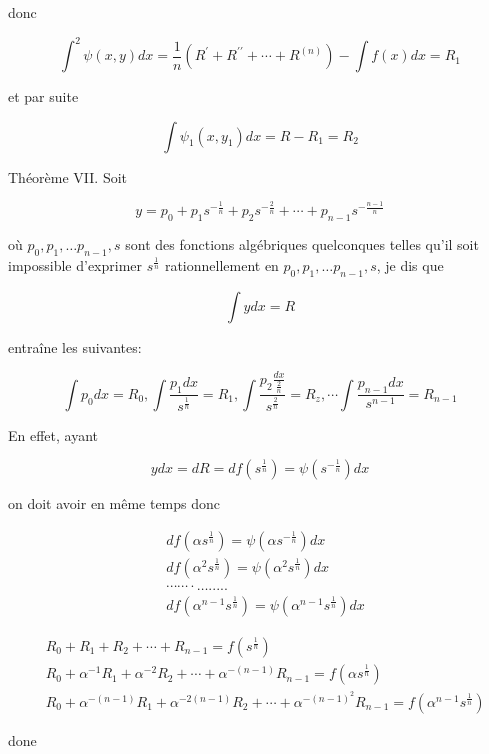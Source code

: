 \documentclass{article}
\begin{document}
donc

\[
\int^{2} \psi(x, y) d x=\frac{1}{n}\left(R^{\prime}+R^{\prime \prime}+\cdots+R^{(n)}\right)-\int f(x) d x=R_{1}
\]

et par suite

\[
\int \psi_{1}\left(x, y_{1}\right) d x=R-R_{1}=R_{2}
\]

Théorème VII. Soit

\[
y=p_{0}+p_{1} s^{-\frac{1}{n}}+p_{2} s^{-\frac{2}{n}}+\cdots+p_{n-1} s^{-\frac{n-1}{n}}
\]

où \(p_{0}, p_{1}, \ldots p_{n-1}, s\) sont des fonctions algébriques quelconques telles qu'il soit impossible d'exprimer \(s^{\frac{1}{n}}\) rationnellement en \(p_{0}, p_{1}, \ldots p_{n-1}, s\), je dis que

\[
\int y d x=R
\]

entraîne les suivantes:

\[
\int p_{0} d x=R_{0}, \int \frac{p_{1} d x}{s^{\frac{1}{n}}}=R_{1}, \int \frac{p_{2} \frac{d x}{\frac{2}{n}}}{s^{\frac{2}{n}}}=R_{z}, \cdots \int \frac{p_{n-1} d x}{s^{n-1}}=R_{n-1}
\]

En effet, ayant

\[
y d x=d R=d f\left(s^{\frac{1}{n}}\right)=\psi\left(s^{-\frac{1}{n}}\right) d x
\]

on doit avoir en même temps
donc

\[
\begin{aligned}
& d f\left(\alpha s^{\frac{1}{n}}\right)=\psi\left(\alpha s^{-\frac{1}{n}}\right) d x \\
& d f\left(\alpha^{2} s^{\frac{1}{n}}\right)=\psi\left(\alpha^{2} s^{\frac{1}{n}}\right) d x \\
& \cdots \cdots \cdot \ldots . . . . . \\
& d f\left(\alpha^{n-1} s^{\frac{1}{n}}\right)=\psi\left(\alpha^{n-1} s^{\frac{1}{n}}\right) d x
\end{aligned}
\]

\[
\begin{aligned}
& R_{0}+R_{1}+R_{2}+\cdots+R_{n-1}=f\left(s^{\frac{1}{n}}\right) \\
& R_{0}+\alpha^{-1} R_{1}+\alpha^{-2} R_{2}+\cdots+\alpha^{-(n-1)} R_{n-1}=f\left(\alpha s^{\frac{1}{n}}\right) \\
& R_{0}+\alpha^{-(n-1)} R_{1}+\alpha^{-2(n-1)} R_{2}+\cdots+\alpha^{-(n-1)^{2}} R_{n-1}=f\left(\alpha^{n-1} s^{\frac{1}{n}}\right)
\end{aligned}
\]

done
\end{document}
